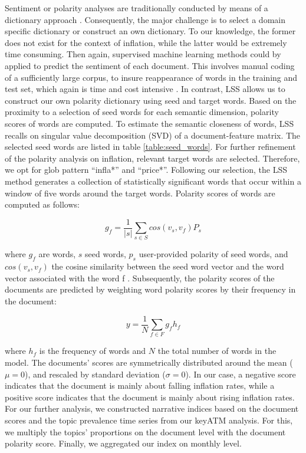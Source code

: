 


\normalsize

Sentiment or polarity analyses are traditionally conducted by means of a dictionary approach \citep[180]{grimmer.2022}. Consequently, the major challenge is to select a domain specific dictionary or construct an own dictionary. To our knowledge, the former does not exist for the context of inflation, while the latter would be extremely time consuming. Then again, supervised machine learning methods could by applied to predict the sentiment of each document. This involves manual coding of a sufficiently large corpus, to insure reappearance of words in the training and test set, which again is time and cost intensive \citep[84]{Watanabe.2021}. In contrast, \textsf{LSS} allows us to construct our own polarity dictionary using seed and target words. Based on the proximity to a selection of seed words for each semantic dimension, polarity scores of words are computed. To estimate the semantic closeness of words, LSS recalls on singular value decomposition (SVD) of a document-feature matrix. The selected seed words are listed in table \ref{table:seed_words}. For further refinement of the polarity analysis on inflation, relevant target words are selected. Therefore, we opt for glob pattern ``infla*'' and ``price*''. Following our selection, the LSS method generates a collection of statistically significant words that occur within a window of five words around the target words. Polarity scores of words are computed as follows:

\begin{equation}
	g_f=\frac{1}{|s|}\sum_{s\in S}cos(v_s, v_f)P_s
\end{equation}


where $g_f$ are words, $s$ seed words, $p_s$ user-provided polarity of seed words, and $cos(v_s, v_f)$ the cosine similarity between the seed word vector and the word vector associated with the word f \citep[86]{Watanabe.2021}. Subsequently, the polarity scores of the documents are predicted by weighting word polarity scores by their frequency in the document: 

\begin{equation}
	y=\frac{1}{N}\sum_{f\in F}g_fh_f
\end{equation}

where $h_f$ is the frequency of words and $N$ the total number of words in the model. The documents' scores are symmetrically distributed around the mean ($\mu = 0$), and rescaled by standard deviation ($\sigma = 0$). In our case, a negative score indicates that the document is mainly about falling inflation rates, while a positive score indicates that the document is mainly about rising inflation rates. For our further analysis, we constructed narrative indices based on the document scores and the topic prevalence time series from our \textsf{keyATM} analysis. For this, we multiply the topics' proportions on the document level with the document polarity score. Finally, we aggregated our index on monthly level. 

